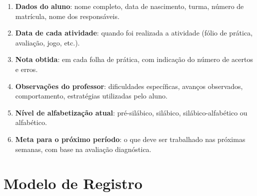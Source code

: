 \begin{enumerate}[leftmargin=2cm]
  \item \textbf{Dados do aluno}: nome completo, data de nascimento,
  turma, n\'{u}mero de matr\'{i}cula, nome dos respons\'{a}veis.

  \item \textbf{Data de cada atividade}: quando foi realizada a atividade
  (fólio de pr\'{a}tica, avalia\c{c}\~{a}o, jogo, etc.).

  \item \textbf{Nota obtida}: em cada folha de pr\'{a}tica, com
  indica\c{c}\~{a}o do n\'{u}mero de acertos e erros.

  \item \textbf{Observa\c{c}\~{o}es do professor}: dificuldades
  espec\'{i}ficas, avan\c{c}os observados, comportamento,
  estrat\'{e}gias utilizadas pelo aluno.

  \item \textbf{N\'{i}vel de alfabetiza\c{c}\~{a}o atual}: pré-silábico,
  silábico, silábico-alfabético ou alfabético.

  \item \textbf{Meta para o pr\'{o}ximo per\'{i}odo}: o que deve ser
  trabalhado nas pr\'{o}ximas semanas, com base na avalia\c{c}\~{a}o
  diagn\'{o}stica.
\end{enumerate}

\section{Modelo de Registro}

\begin{table}[h]
\centering
\caption{Modelo de Registro de Progresso Individual}
\label{tab:registro-modelo}
\end{table}

